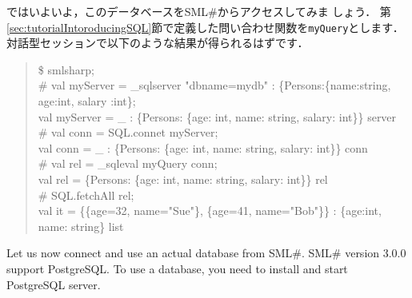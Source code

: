 \documentclass{jbook}
\newcommand{\smlsharp}{SML\#}
\newcommand{\version}{3.0.0}
\newenvironment{program}{\begin{quote}\begin{tt}}%
                        {\end{tt}\end{quote}}
\begin{document}
	ではいよいよ，このデータベースを\smlsharp{}からアクセスしてみま
しょう．
	第\ref{sec:tutorialIntoroducingSQL}節で定義した問い合わせ関数を{\tt myQuery}とします．
	対話型セッションで以下のような結果が得られるはずです．
\begin{program}
\$ smlsharp;\\
\# val myServer = \_sqlserver "dbname=mydb" : \{Persons:\{name:string, age:int, salary :int\};\\
val myServer = \_ : \{Persons: \{age: int, name: string, salary: int\}\} server\\
\# val conn = SQL.connet myServer;\\
val conn = \_ : \{Persons: \{age: int, name: string, salary: int\}\} conn\\
\# val rel = \_sqleval myQuery conn;\\
val rel = \{Persons: \{age: int, name: string, salary: int\}\} rel\\
\# SQL.fetchAll rel;\\
val it = \{\{age=32, name="Sue"\}, \{age=41, name="Bob"\}\} : \{age:int, name: string\} list
\end{program}
\else%
	Let us now connect and use an actual database from \smlsharp{}.
	\smlsharp{} version \version{} support PostgreSQL.
	To use a database, you need to install and start PostgreSQL server.
	
\end{document}
